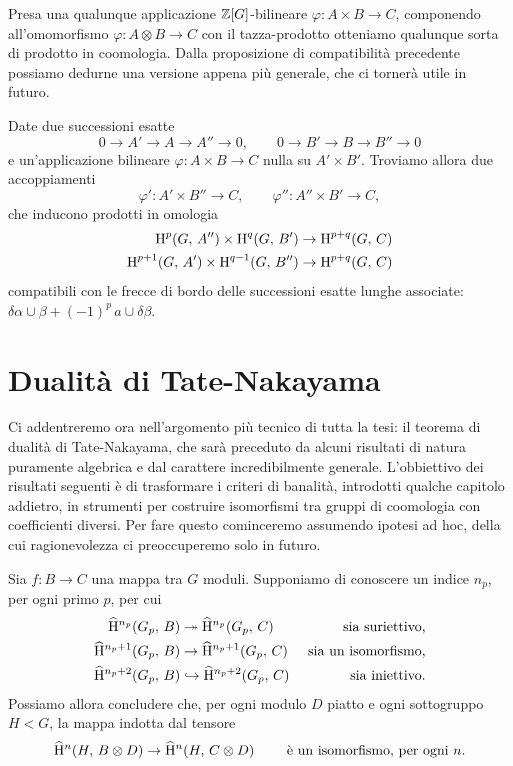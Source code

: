 Presa una qualunque applicazione $ \mathbb{Z}[G] $-bilineare $ \varphi\colon A \times B \to C $, componendo all'omomorfismo $ \varphi\colon A \otimes B \to C  $ con il tazza-prodotto otteniamo qualunque sorta di prodotto in coomologia. Dalla proposizione di compatibilità precedente possiamo dedurne una versione appena più generale, che ci tornerà utile in futuro.

\begin{lemma}\label{cup2}
	Date due successioni esatte
	\[ 0 \to A' \to A \to A'' \to 0, \qquad 0 \to B' \to B \to B'' \to 0 \]
	e un'applicazione bilineare $  \varphi\colon A \times B \to C $ nulla su $ A'\times B' $. Troviamo allora due accoppiamenti
	\[ \varphi'\colon A' \times B'' \to C, \qquad \varphi''\colon A'' \times B' \to C, \]
	che inducono prodotti in omologia
	\begin{align*}
		\operatorname{H}^{p}(G, \, A'') \times \operatorname{H}^{q}(G, \, B') &\to \operatorname{H}^{p+q}(G, \, C)\\
		\operatorname{H}^{p+1}(G, \, A') \times \operatorname{H}^{q-1}(G, \, B'') &\to \operatorname{H}^{p+q}(G, \, C)
	\end{align*}
	compatibili con le frecce di bordo delle successioni esatte lunghe associate:  $ \delta \alpha \cup \beta + (-1)^p \, a \cup \delta \beta $.
\end{lemma}

\section{Dualità di Tate-Nakayama}
Ci addentreremo ora nell'argomento più tecnico di tutta la tesi: il teorema di dualità di Tate-Nakayama, che sarà preceduto da alcuni risultati di natura puramente algebrica e dal carattere incredibilmente generale. L'obbiettivo dei risultati seguenti è di trasformare i criteri di banalità, introdotti qualche capitolo addietro, in strumenti per costruire isomorfismi tra gruppi di coomologia con coefficienti diversi. Per fare questo cominceremo assumendo ipotesi ad hoc, della cui ragionevolezza ci preoccuperemo solo in futuro. 

\begin{proposition}
	Sia $ f \colon B \to C $ una mappa tra $ G $ moduli. Supponiamo di conoscere un indice $ n_p $, per ogni primo $ p $, per cui
	\begin{align*}
		\operatorname{\widehat{H}^{\mathnormal{n_p}}}(G_p,\, B) &\twoheadrightarrow \operatorname{\widehat{H}^{\mathnormal{n_p}}}(G_p,\, C) & \text{ sia suriettivo,} \\
		\operatorname{\widehat{H}^{\mathnormal{n_p}+1}}(G_p,\, B) &\to \operatorname{\widehat{H}^{\mathnormal{n_p}+1}}(G_p,\, C) & \text{ sia un isomorfismo,} \\
		\operatorname{\widehat{H}^{\mathnormal{n_p}+2}}(G_p,\, B) &\hookrightarrow \operatorname{\widehat{H}^{\mathnormal{n_p}+2}}(G_p,\, C) & \text{ sia iniettivo.}
	\end{align*}
	Possiamo allora concludere che, per ogni modulo $ D $ piatto e ogni sottogruppo $ H < G $, la mappa indotta dal tensore
	\[ \operatorname{\widehat{H}^{\mathnormal{n}}}(H, \, B \otimes D) \to \operatorname{\widehat{H}^{\mathnormal{n}}}(H, \, C \otimes D) \qquad\text{ è un isomorfismo, per ogni } n. \]
\end{proposition}

